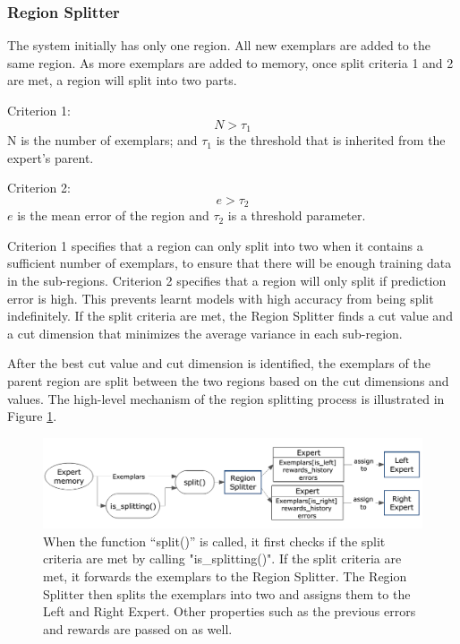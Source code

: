 \FloatBarrier
\subsubsection{Region Splitter}

The system initially has only one region. All new exemplars are added to the same region. As more exemplars are added to memory, once split criteria 1 and 2 are met, a region will split into two parts.

Criterion 1: 
\begin{equation}\label{eqn:split-criterion1}
	N>\tau_1
\end{equation}
N is the number of exemplars; and $\tau_1$ is the threshold that is inherited from the expert's parent. 

Criterion 2:	
\begin{equation}\label{eqn:split-criterion2}
	 e>\tau_2
\end{equation}	
$e$ is the mean error of the region and $\tau_2$ is a threshold parameter. 

Criterion 1 specifies that a region can only split into two when it contains a sufficient number of exemplars, to ensure that there will be enough training data in the sub-regions. Criterion 2 specifies that a region will only split if prediction error is high. This prevents learnt models with high accuracy from being split indefinitely. 
If the split criteria are met, the Region Splitter finds a cut value and a cut dimension that minimizes the average variance in each sub-region. 


After the best cut value and cut dimension is identified, the exemplars of the parent region are split between the two regions based on the cut dimensions and values. The high-level mechanism of the region splitting process is illustrated in Figure \ref{fig:Block Diagram RegionSplitter}.

\begin{figure}[!htbp]
	\centering
	\includegraphics[width=1.0 \textwidth]{"fig/cbla/Block Diagram RegionSplitter"}
	\caption[Block diagram of the Region Splitter]{When the function “split()” is called, it first checks if the split criteria are met by calling "is\_splitting()". If the split criteria are met, it forwards the exemplars to the Region Splitter. The Region Splitter then splits the exemplars into two and assigns them to the Left and Right Expert. Other properties such as the previous errors and rewards are passed on as well. }
	\label{fig:Block Diagram RegionSplitter}
\end{figure}

